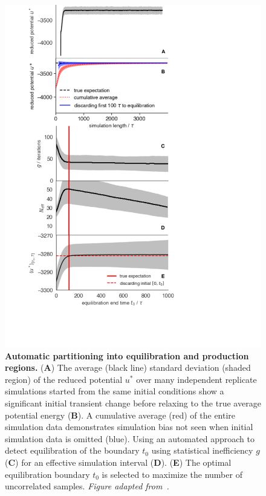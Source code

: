 \documentclass[9pt,bestpractices,pubversion]{livecoms}
\begin{document}
\begin{figure}
    \centering
    \includegraphics[width=0.95\linewidth]{figures/fig11_equib_detection/Figure.pdf}
    \caption{{\bf Automatic partitioning into equilibration and production regions.}
    (\textbf{A}) The average (black line) standard deviation (shaded region) of the reduced potential $u^*$ over many independent replicate simulations started from the same initial conditions show a significant initial transient change before relaxing to the true average potential energy (\textbf{B}). A cumulative average (red) of the entire simulation data demonstrates simulation bias not seen when initial simulation data is omitted (blue). Using an automated approach to detect equilibration of the boundary $t_0$ using statistical inefficiency $g$ (\textbf{C})  for an effective simulation interval (\textbf{D}). (\textbf{E}) The optimal equilibration boundary $t_0$ is selected to maximize the number of uncorrelated samples.
    \emph{Figure adapted from~\cite{chodera2016simple}.}
    }
    \label{fig:automatic-equilibration-detection}
\end{figure}
\end{document}
